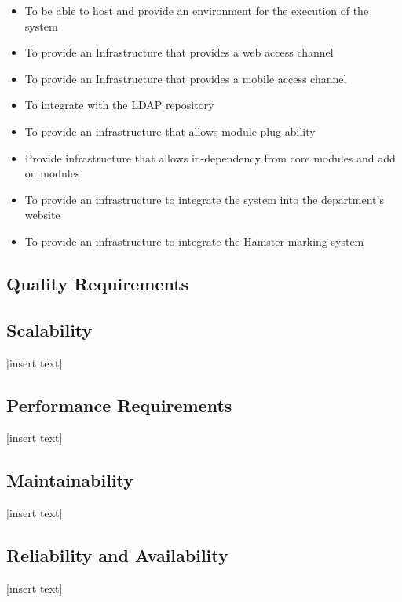 \documentclass[11pt]{article}
\begin{document}
	\begin{itemize}
	\item To be able to host and provide an environment for the execution of the system
	
	\item To provide an Infrastructure that provides a web access channel
	
	\item To provide an Infrastructure that provides a mobile access channel
	
	\item To integrate with the LDAP repository
	
	\item To provide an infrastructure that allows module plug-ability
	
	\item Provide infrastructure that allows in-dependency from core modules and add on modules
	
	\item To provide an infrastructure to integrate the system into the department's website
	
	\item To provide an infrastructure to integrate the Hamster marking system
	\end{itemize}

	\newpage
	\begin{center}
	\section{\textbf{\huge{Quality Requirements}}}
	\end{center}
	\subsection{Scalability}
		[insert text]
	\subsection{Performance Requirements}
		[insert text]
	\subsection{Maintainability}
		[insert text]
	\subsection{Reliability and Availability}
		[insert text]
\end{document}
